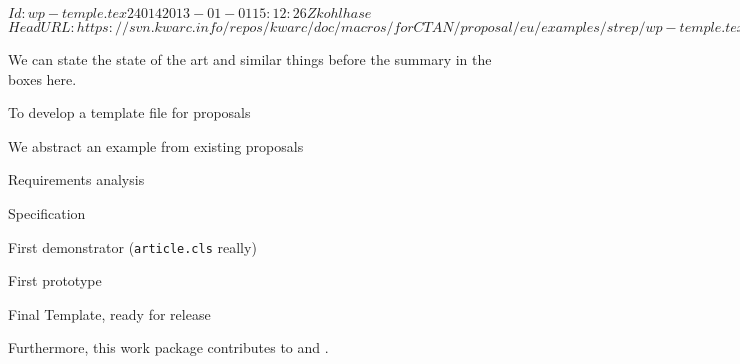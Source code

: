 \svnInfo $Id: wp-temple.tex 24014 2013-01-01 15:12:26Z kohlhase $
\svnKeyword $HeadURL: https://svn.kwarc.info/repos/kwarc/doc/macros/forCTAN/proposal/eu/examples/strep/wp-temple.tex $
\begin{workpackage}[id=temple,type=DEM,lead=bar,
  wphases=6-12!1,
  title={\pn} Proposal Template,short=Template,barRM=6,bazRM=6]
We can state the state of the art and similar things before the summary in the boxes
here. 
\wpheadertable

\begin{wpobjectives}
  To develop a template file for {\pn} proposals
\end{wpobjectives}

\begin{wpdescription}
  We abstract an example from existing proposals
\end{wpdescription}

\begin{wpdelivs}
  \begin{wpdeliv}[due=6,id=req,nature=R,dissem=PP,miles=kickoff]
    {Requirements analysis}
  \end{wpdeliv}
  \begin{wpdeliv}[due=12,id=spec,nature=R,dissem=PU,miles=consensus]
    {{\pn} Specification }
  \end{wpdeliv}
  \begin{wpdeliv}[due=18,id=demonstrator,nature=D,dissem=PU,miles={consensus,final}]
    {First demonstrator ({\tt{article.cls}} really)}
  \end{wpdeliv}
  \begin{wpdeliv}[due=24,id=proto,nature=P,dissem=PU,miles=final]
    {First prototype}
  \end{wpdeliv}
  \begin{wpdeliv}[due=36,id=release,nature=P,dissem=PU,miles=final]
    {Final Template, ready for release}
  \end{wpdeliv}
\end{wpdelivs}
Furthermore, this work package contributes to {} and
{}.
\end{workpackage}


